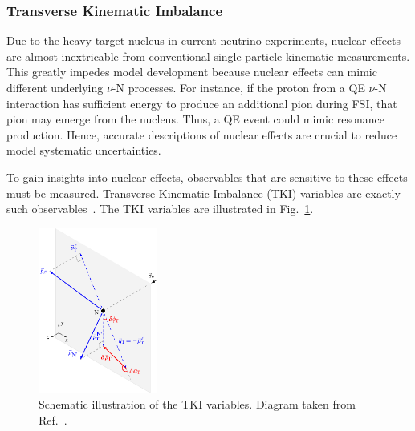 \subsubsection{Transverse Kinematic Imbalance}
\label{sec:nuint-tki}
Due to the heavy target nucleus in current neutrino experiments, nuclear effects are almost inextricable from conventional single-particle kinematic measurements.
This greatly impedes model development because nuclear effects can mimic different underlying $\nu$-N processes.
For instance, if the proton from a QE $\nu$-N interaction has sufficient energy to produce an additional pion during FSI, that pion may emerge from the nucleus.
Thus, a QE event could mimic resonance production.
Hence, accurate descriptions of nuclear effects are crucial to reduce model systematic uncertainties.

To gain insights into nuclear effects, observables that are sensitive to these effects must be measured.
Transverse Kinematic Imbalance (TKI) variables are exactly such observables~\cite{Lu:2015hea, Lu:2015tcr}.
The TKI variables are illustrated in Fig.~\ref{fig:stki}.

\begin{figure}[!htb] 	
    \centering 		
    \includegraphics[width=0.35\textwidth]{figures/stki.eps}
    \caption{\label{fig:stki} Schematic illustration of the TKI variables. Diagram taken from Ref.~\cite{Lu:2015tcr}.} 
\end{figure}

